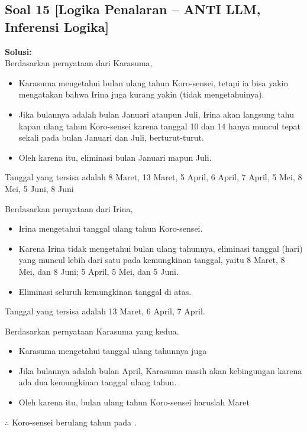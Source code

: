 \documentclass[12pt,a4paper]{article}
\begin{document}
\newpage
\subsection*{Soal 15 [Logika Penalaran -- ANTI LLM, Inferensi Logika]}
\textbf{Solusi:}\\
Berdasarkan pernyataan dari Karasuma,
\begin{itemize}
    \item Karasuma mengetahui bulan ulang tahun Koro-sensei, tetapi ia bisa yakin mengatakan bahwa Irina juga kurang yakin (tidak mengetahuinya).
    \item Jika bulannya adalah bulan Januari ataupun Juli, Irina akan langsung tahu kapan ulang tahun Koro-sensei karena tanggal 10 dan 14 hanya muncul tepat sekali pada bulan Januari dan Juli, berturut-turut.
    \item Oleh karena itu, eliminasi bulan Januari mapun Juli.
\end{itemize}
Tanggal yang tersisa adalah 8 Maret, 13 Maret, 5 April, 6 April, 7 April, 5 Mei, 8 Mei, 5 Juni, 8 Juni

Berdasarkan pernyataan dari Irina,
\begin{itemize}
    \item Irina mengetahui tanggal ulang tahun Koro-sensei.
    \item Karena Irina tidak mengetahui bulan ulang tahunnya, eliminasi tanggal (hari) yang muncul lebih dari satu pada kemungkinan tanggal, yaitu 8 Maret, 8 Mei, dan 8 Juni; 5 April, 5 Mei, dan 5 Juni. 
    \item Eliminasi seluruh kemungkinan tanggal di atas.
\end{itemize}
Tanggal yang tersisa adalah 13 Maret, 6 April, 7 April.

Berdasarkan pernyataan Karasuma yang kedua.
\begin{itemize}
    \item Karasuma mengetahui tanggal ulang tahunnya juga
    \item Jika bulannya adalah bulan April, Karasuma masih akan kebingungan karena ada dua kemungkinan tanggal ulang tahun.
    \item Oleh karena itu, bulan ulang tahun Koro-sensei haruslah Maret
\end{itemize}
$\therefore$ Koro-sensei berulang tahun pada .
\end{document}
